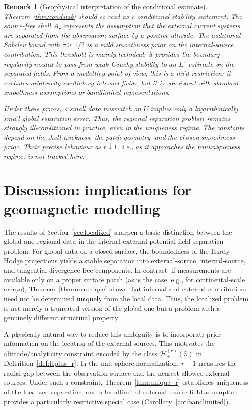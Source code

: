 \documentclass[a4paper, 11pt]{article}
\newtheorem{remark}[theorem]{Remark}
\renewcommand{\SS}{\mathbb{S}}
\begin{document}
\begin{remark}[Geophysical interpretation of the conditional estimate] Theorem~\ref{thm:condstab} should be read as a conditional stability statement. The source-free shell \(A_r\) represents the assumption that the external current systems are separated from the observation surface by a positive altitude. The additional Sobolev bound with \(\tau\geq1/2\) is a mild smoothness prior on the internal-source contribution. This threshold is mainly technical: it provides the boundary regularity needed to pass from weak Cauchy stability to an \(L^2\)-estimate on the separated fields. From a modelling point of view, this is a mild restriction: it excludes arbitrarily oscillatory internal fields, but it is consistent with standard smoothness assumptions or bandlimited representations. 

Under these priors, a small data mismatch on \(U\) implies only a logarithmically small global separation error. Thus, the regional separation problem remains strongly ill-conditioned in practice, even in the uniqueness regime. The constants depend on the shell thickness, the patch geometry, and the chosen smoothness prior. Their precise behaviour as \(r\downarrow1\), i.e., as it approaches the nonuniqueness regime, is not tracked here. \end{remark}


\section{Discussion: implications for geomagnetic modelling}\label{sec:discussion}

The results of Section~\ref{sec:localized} sharpen a basic distinction between the global and regional data in the internal-external potential field separation problem. For global data on a closed surface, the boundedness of the Hardy-Hodge projections yields a stable separation into external-source, internal-source, and tangential divergence-free components. In contrast, if measurements are available only on a proper surface patch (as is the case, e.g., for continental-scale arrays), Theorem~\ref{thm:nonunique} shows that internal and external contributions need not be determined uniquely from the local data. Thus, the localized problem is not merely a truncated version of the global one but a problem with a genuinely different structural property.

A physically natural way to reduce this ambiguity is to incorporate prior information on the location of the external sources. This motivates the altitude/analyticity constraint encoded by the class $\mathcal H_+^{(r)}(\SS)$ in Definition~\ref{def:Hplus_r}. In the unit-sphere normalization, $r-1$ measures the radial gap between the observation surface and the nearest allowed external sources. Under such a constraint, Theorem~\ref{thm:unique_r} establishes uniqueness of the localized separation, and a bandlimited external-source field assumption provides a particularly restrictive special case (Corollary~\ref{cor:bandlimited}).
\end{document}
